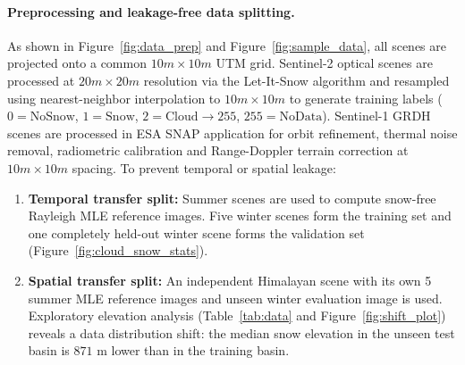 \documentclass{article}
\begin{document}
\paragraph{Preprocessing and leakage-free data splitting.}
As shown in Figure~\ref{fig:data_prep} and Figure~\ref{fig:sample_data}, all scenes are projected onto a common $10m \times 10m$ UTM grid. Sentinel-2 optical scenes are processed at $20m \times 20m$ resolution via the Let-It-Snow algorithm \citep{simon2018algorithm} and resampled using nearest-neighbor interpolation to $10m \times 10m$ to generate training labels ($0=\text{NoSnow}$, $1=\text{Snow}$, $2=\text{Cloud}\rightarrow 255$, $255=\text{NoData}$). Sentinel-1 GRDH scenes are processed in ESA SNAP application for orbit refinement, thermal noise removal, radiometric calibration and Range-Doppler terrain correction at $10m \times 10m$ spacing. To prevent temporal or spatial leakage:
\begin{enumerate}
  \item \textbf{Temporal transfer split:} Summer scenes are used to compute snow-free Rayleigh MLE reference images. Five winter scenes form the training set and one completely held-out winter scene forms the validation set (Figure~\ref{fig:cloud_snow_stats}).
  \item \textbf{Spatial transfer split:} An independent Himalayan scene with its own 5 summer MLE reference images and unseen winter evaluation image is used. Exploratory elevation analysis (Table~\ref{tab:data} and Figure~\ref{fig:shift_plot}) reveals a data distribution shift: the median snow elevation in the unseen test basin is $871\text{ m}$ lower than in the training basin.
\end{enumerate}
\end{document}
